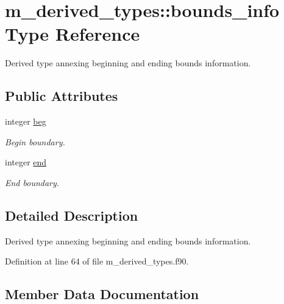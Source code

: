 \hypertarget{structm__derived__types_1_1bounds__info}{}\section{m\+\_\+derived\+\_\+types\+:\+:bounds\+\_\+info Type Reference}
\label{structm__derived__types_1_1bounds__info}


Derived type annexing beginning and ending bounds information.  


\subsection*{Public Attributes}
\begin{DoxyCompactItemize}
\item 
integer \hyperlink{structm__derived__types_1_1bounds__info_a2e2ca507eb176129988d49544fbe9020}{beg}
\begin{DoxyCompactList}\small\item\em Begin boundary. \end{DoxyCompactList}\item 
integer \hyperlink{structm__derived__types_1_1bounds__info_a7bc03a7a90da94d38e6656d65281bc35}{end}
\begin{DoxyCompactList}\small\item\em End boundary. \end{DoxyCompactList}\end{DoxyCompactItemize}


\subsection{Detailed Description}
Derived type annexing beginning and ending bounds information. 

Definition at line 64 of file m\+\_\+derived\+\_\+types.\+f90.



\subsection{Member Data Documentation}
\mbox{\label{structm__derived__types_1_1bounds__info_a2e2ca507eb176129988d49544fbe9020}} 
